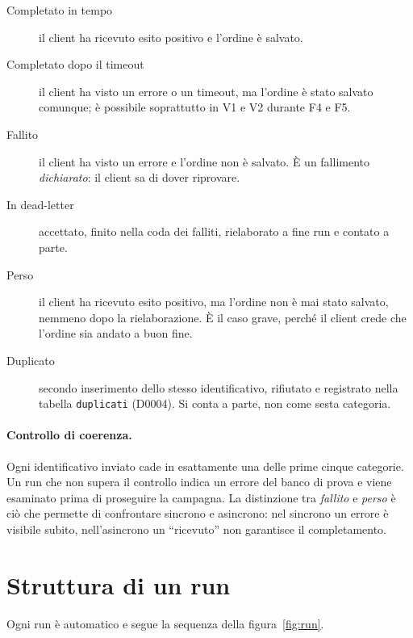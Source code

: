 \begin{description}
  \item[Completato in tempo] il client ha ricevuto esito positivo e l'ordine è salvato.
  \item[Completato dopo il timeout] il client ha visto un errore o un timeout, ma l'ordine è stato salvato comunque; è possibile soprattutto in V1 e V2 durante F4 e F5.
  \item[Fallito] il client ha visto un errore e l'ordine non è salvato. È un fallimento \emph{dichiarato}: il client sa di dover riprovare.
  \item[In dead-letter] accettato, finito nella coda dei falliti, rielaborato a fine run e contato a parte.
  \item[Perso] il client ha ricevuto esito positivo, ma l'ordine non è mai stato salvato, nemmeno dopo la rielaborazione. È il caso grave, perché il client crede che l'ordine sia andato a buon fine.
  \item[Duplicato] secondo inserimento dello stesso identificativo, rifiutato e registrato nella tabella \texttt{duplicati} (D0004). Si conta a parte, non come sesta categoria.
\end{description}

\paragraph{Controllo di coerenza.} Ogni identificativo inviato cade in esattamente una delle prime cinque categorie. Un run che non supera il controllo indica un errore del banco di prova e viene esaminato prima di proseguire la campagna. La distinzione tra \emph{fallito} e \emph{perso} è ciò che permette di confrontare sincrono e asincrono: nel sincrono un errore è visibile subito, nell'asincrono un ``ricevuto'' non garantisce il completamento.

\section{Struttura di un run}

Ogni run è automatico e segue la sequenza della figura~\ref{fig:run}.

